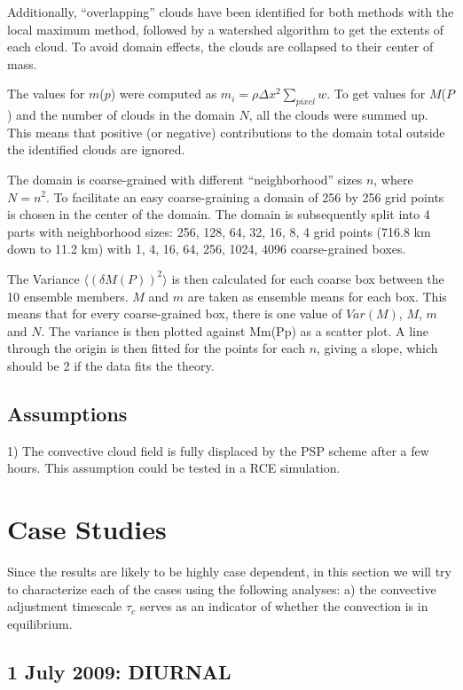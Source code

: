 \documentclass[a4paper, 12pt]{article}
\begin{document}
Additionally, ``overlapping'' clouds have been identified for both methods with the local maximum method, followed by a watershed algorithm to get the extents of each cloud. To avoid domain effects, the clouds are collapsed to their center of mass. 

The values for $m$($p$) were computed as  $m_i = \rho \Delta x^2 \sum_{pixel} w$. To get values for $M$($P$) and the number of clouds in the domain $N$, all the clouds were summed up. This means that positive (or negative) contributions to the domain total outside the identified clouds are ignored. 

The domain is coarse-grained with different ``neighborhood'' sizes $n$, where $N = n^2$. To facilitate an easy coarse-graining a domain of 256 by 256 grid points is chosen in the center of the domain. The domain is subsequently split into 4 parts with neighborhood sizes: 256, 128, 64, 32, 16, 8, 4 grid points (716.8 km down to 11.2 km) with 1, 4, 16, 64, 256, 1024, 4096 coarse-grained boxes. 

The Variance $\langle (\delta M(P))^2 \rangle$ is then calculated for each coarse box between the 10 ensemble members. $M$ and $m$ are taken as ensemble means for each box. This means that for every coarse-grained box, there is one value of $Var(M)$, $M$, $m$ and $N$. 
 The variance is then plotted against Mm(Pp) as a scatter plot. A line through the origin is then fitted for the points for each $n$, giving a slope, which should be 2 if the data fits the theory. 

\subsection{Assumptions}
1) The convective cloud field is fully displaced by the PSP scheme after a few hours. This assumption could be tested in a RCE simulation. 

\section{Case Studies}
Since the results are likely to be highly case dependent, in this section we will try to characterize each of the cases using the following analyses: a) the convective adjustment timescale $\tau_c$ serves as an indicator of whether the convection is in equilibrium. 
\subsection{1 July 2009: DIURNAL}
\end{document}
